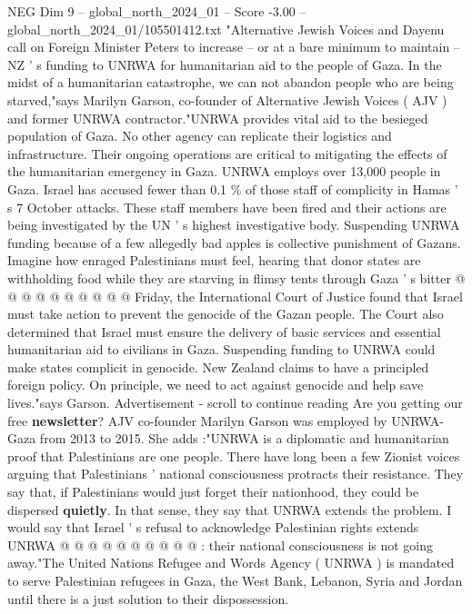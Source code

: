\begin{textsample}{NEG Dim 9 – global\_north\_2024\_01 – Score -3.00 – global\_north\_2024\_01/105501412.txt}  \label{ex:f9_neg_187}
"Alternative Jewish Voices and Dayenu call on Foreign Minister Peters to increase -- or at a bare minimum to maintain -- NZ ' s funding to UNRWA for humanitarian aid to the people of Gaza.
In the midst of a humanitarian catastrophe, we can not abandon people who are being starved,"says Marilyn Garson, co-founder of Alternative Jewish Voices ( AJV ) and former UNRWA contractor."UNRWA provides vital aid to the besieged population of Gaza.
No other agency can replicate their logistics and infrastructure.
Their ongoing operations are critical to mitigating the effects of the humanitarian emergency in Gaza.
UNRWA employs over 13,000 people in Gaza.
Israel has accused fewer than 0.1 \% of those staff of complicity in Hamas ' s 7 October attacks.
These staff members have been fired and their actions are being investigated by the UN ' s highest investigative body.
Suspending UNRWA funding because of a few allegedly bad apples is collective punishment of Gazans.
Imagine how enraged Palestinians must feel, hearing that donor states are withholding food while they are starving in flimsy tents through Gaza ' s bitter @ @ @ @ @ @ @ @ @ @ Friday, the International Court of Justice found that Israel must take action to prevent the genocide of the Gazan people.
The Court also determined that Israel must ensure the delivery of basic services and essential humanitarian aid to civilians in Gaza.
Suspending funding to UNRWA could make states complicit in genocide.
New Zealand claims to have a principled foreign policy.
On principle, we need to act against genocide and help save lives."says Garson.
Advertisement - scroll to continue reading Are you getting our free \textbf{newsletter}?
AJV co-founder Marilyn Garson was employed by UNRWA-Gaza from 2013 to 2015.
She adds :"UNRWA is a diplomatic and humanitarian proof that Palestinians are one people.
There have long been a few Zionist voices arguing that Palestinians ' national consciousness protracts their resistance.
They say that, if Palestinians would just forget their nationhood, they could be dispersed \textbf{quietly}.
In that sense, they say that UNRWA extends the problem.
I would say that Israel ' s refusal to acknowledge Palestinian rights extends UNRWA @ @ @ @ @ @ @ @ @ @ : their national consciousness is not going away."The United Nations Refugee and Words Agency ( UNRWA ) is mandated to serve Palestinian refugees in Gaza, the West Bank, Lebanon, Syria and Jordan until there is a just solution to their dispossession.

\end{textsample}
